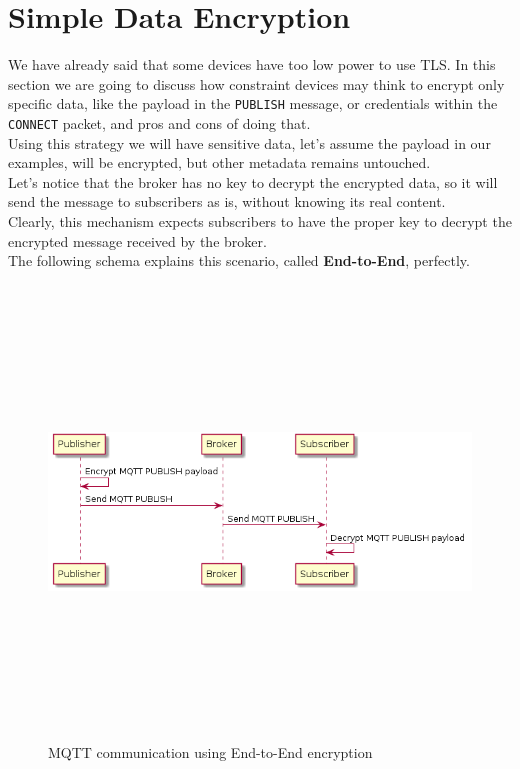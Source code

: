 \documentclass[12pt]{report}
\begin{document}
{\section{Simple Data Encryption}
\bigskip
We have already said that some devices have too low power to use TLS.
In this section we are going to discuss how constraint devices may think to encrypt only specific data, like the payload in the \texttt{PUBLISH} message, or credentials within the \texttt{CONNECT} packet, and pros and cons of doing that.\\
Using this strategy we will have sensitive data, let's assume the payload in our examples, will be encrypted, but other metadata remains untouched.\\
Let's notice that the broker has no key to decrypt the encrypted data, so it will send the message to subscribers as is, without knowing its real content.\\
Clearly, this mechanism expects subscribers to have the proper key to decrypt the encrypted message received by the broker.\\
The following schema explains this scenario, called \textbf{End-to-End}, perfectly.

\begin{figure}[H]
\includegraphics[width=12cm,height=12cm,keepaspectratio]{end_to_end}
\centering
\caption{MQTT communication using End-to-End encryption}
\end{figure}

}
\end{document}
